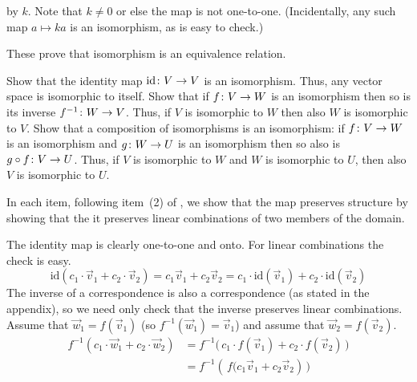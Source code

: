 \begin{exercises}
\begin{answer}
      by \( k \).
      Note that \( k\neq 0 \) or else the map is not one-to-one.
      (Incidentally, any such map $a\mapsto ka$ is an isomorphism,
      as is easy to check.)
     \end{answer}
  \recommended \item 
    These prove that isomorphism is an equivalence relation.
    \begin{exparts}
      \partsitem Show that the identity map $\mbox{$\mbox{id}\colon V\to V$}$ is an 
        isomorphism.
        Thus, any vector space is isomorphic to itself.
      \partsitem Show that if $\mbox{$f\colon V\to W$}$ is an isomorphism then
        so is its inverse $\mbox{$f^{-1}\colon W\to V$}$. 
        Thus, if $V$ is isomorphic to $W$ then also $W$ is isomorphic to $V$.
      \partsitem Show that a composition of isomorphisms is an isomorphism:
        if $\mbox{$f\colon V\to W$}$ is an isomorphism and $\mbox{$g\colon W\to U$}$ is an
        isomorphism then so also is $\mbox{$g\mathbin\circ f\colon V\to U$}$.
        Thus, if $V$ is isomorphic to $W$ and $W$ is isomorphic to $U$,
        then also $V$ is isomorphic to $U$.
    \end{exparts}
    \begin{answer}
      In each item, following item~(2) of 
      , we show that the map preserves
      structure by showing that the it preserves linear combinations
      of two members of the domain.
      \begin{exparts}
        \partsitem 
          The identity map is clearly one-to-one and onto.
          For linear combinations the check is easy.
          \begin{equation*}
            \mbox{id}(c_1\cdot \vec{v}_1+c_2\cdot \vec{v}_2)
             =c_1\vec{v}_1+c_2\vec{v}_2
             =c_1\cdot \mbox{id}(\vec{v}_1)+c_2\cdot \mbox{id}(\vec{v}_2)
          \end{equation*}
        \partsitem The inverse of a correspondence is also a correspondence
          (as stated in the appendix), so we need only check that the 
          inverse preserves linear combinations.
          Assume that \( \vec{w}_1=f(\vec{v}_1) \) 
          (so \( f^{-1}(\vec{w}_1)=\vec{v}_1 \)) 
          and assume that \( \vec{w}_2=f(\vec{v}_2) \).
          \begin{align*}
            f^{-1}(c_1\cdot\vec{w}_1+c_2\cdot\vec{w}_2)
              &=f^{-1}\bigl(\,c_1\cdot f(\vec{v}_1)
                             +c_2\cdot f(\vec{v}_2)\,\bigr) \\
              &=f^{-1}(\,f\bigl(c_1\vec{v}_1+c_2\vec{v}_2)\,\bigr)    \\

\end{align*}
\end{exparts}
\end{answer}
\end{exercises}
